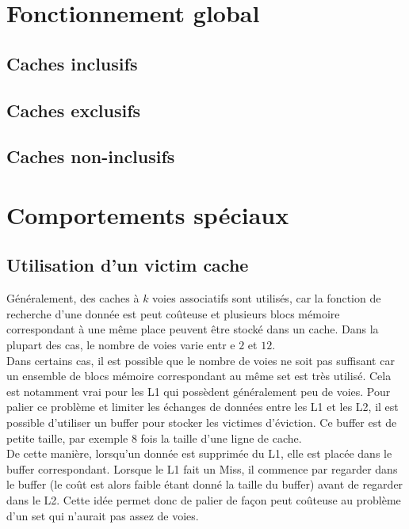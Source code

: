 \documentclass[a4paper]{article}
\begin{document}
\newpage
\section{Fonctionnement global}

\subsection{Caches inclusifs}

\subsection{Caches exclusifs}

\subsection{Caches non-inclusifs}


\newpage
\section{Comportements spéciaux}

\subsection{Utilisation d'un victim cache}
\indent Généralement, des caches à $k$ voies associatifs sont utilisés, car la fonction de recherche d'une donnée est peut coûteuse et plusieurs blocs mémoire correspondant à une même place peuvent être stocké dans un cache. Dans la plupart des cas, le nombre de voies varie entr e $2$ et $12$. \\

\indent Dans certains cas, il est possible que le nombre de voies ne soit pas suffisant car un ensemble de blocs mémoire correspondant au même set est très utilisé. Cela est notamment vrai pour les L1 qui possèdent généralement peu de voies. Pour palier ce problème et limiter les échanges de données entre les L1 et les L2, il est possible d'utiliser un buffer pour stocker les victimes d'éviction. Ce buffer est de petite taille, par exemple $8$ fois la taille d'une ligne de cache. \\

\indent De cette manière, lorsqu'un donnée est supprimée du L1, elle est placée dans le buffer correspondant. Lorsque le L1 fait un Miss, il commence par regarder dans le buffer (le coût est alors faible étant donné la taille du buffer) avant de regarder dans le L2. Cette idée permet donc de palier de façon peut coûteuse au problème d'un set qui n'aurait pas assez de voies.
\end{document}
